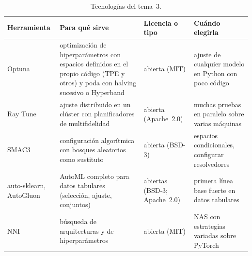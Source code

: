 \begin{table}[h]
\centering\small
\caption{Tecnologías del tema~3.}\label{tab:tec3}
\begin{tabularx}{\textwidth}{@{}>{\raggedright\arraybackslash}p{2.5cm}>{\raggedright\arraybackslash}X>{\raggedright\arraybackslash}p{2.1cm}>{\raggedright\arraybackslash}X@{}}
\toprule
Herramienta & Para qué sirve & Licencia o tipo & Cuándo elegirla \\
\midrule
Optuna~\cite{optuna} & optimización de hiperparámetros con espacios definidos en el propio código (TPE y otros) y poda con halving sucesivo o Hyperband & abierta (MIT) & ajuste de cualquier modelo en Python con poco código \\
Ray Tune~\cite{ray} & ajuste distribuido en un clúster con planificadores de multifidelidad & abierta (Apache~2.0) & muchas pruebas en paralelo sobre varias máquinas \\
SMAC3 & configuración algorítmica con bosques aleatorios como sustituto & abierta (BSD-3) & espacios condicionales, configurar resolvedores \\
auto-sklearn, AutoGluon & AutoML completo para datos tabulares (selección, ajuste, conjuntos) & abiertas (BSD-3; Apache~2.0) & primera línea base fuerte en datos tabulares \\
NNI & búsqueda de arquitecturas y de hiperparámetros & abierta (MIT) & NAS con estrategias variadas sobre PyTorch \\
\bottomrule
\end{tabularx}
\end{table}

\addtocounter{definicion}{1}%

